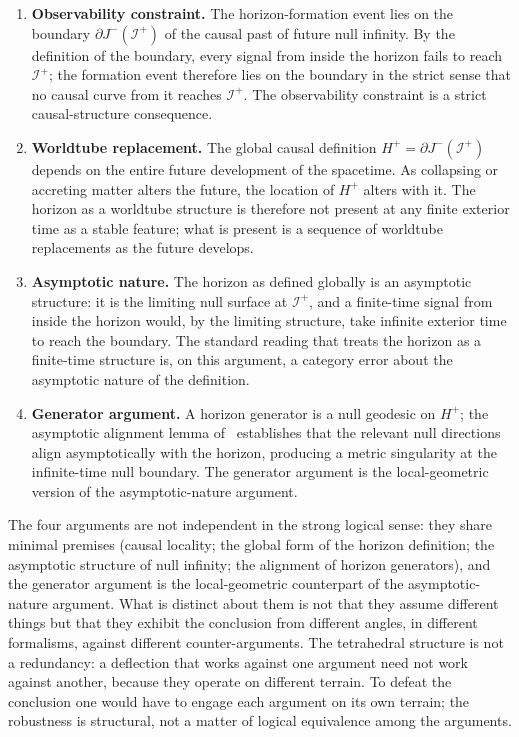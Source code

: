 \documentclass[11pt,a4paper]{article}
\theoremstyle{definition}
\begin{document}
\begin{enumerate}
\item \textbf{Observability constraint.} The horizon-formation event lies on the boundary $\partial J^{-}(\mathscr{I}^{+})$ of the causal past of future null infinity. By the definition of the boundary, every signal from inside the horizon fails to reach $\mathscr{I}^{+}$; the formation event therefore lies on the boundary in the strict sense that no causal curve from it reaches $\mathscr{I}^{+}$. The observability constraint is a strict causal-structure consequence.

\item \textbf{Worldtube replacement.} The global causal definition $H^{+}=\partial J^{-}(\mathscr{I}^{+})$ depends on the entire future development of the spacetime. As collapsing or accreting matter alters the future, the location of $H^{+}$ alters with it. The horizon as a worldtube structure is therefore not present at any finite exterior time as a stable feature; what is present is a sequence of worldtube replacements as the future develops.

\item \textbf{Asymptotic nature.} The horizon as defined globally is an asymptotic structure: it is the limiting null surface at $\mathscr{I}^{+}$, and a finite-time signal from inside the horizon would, by the limiting structure, take infinite exterior time to reach the boundary. The standard reading that treats the horizon as a finite-time structure is, on this argument, a category error about the asymptotic nature of the definition.

\item \textbf{Generator argument.} A horizon generator is a null geodesic on $H^{+}$; the asymptotic alignment lemma of~\cite{JanzenBHcausality} establishes that the relevant null directions align asymptotically with the horizon, producing a metric singularity at the infinite-time null boundary. The generator argument is the local-geometric version of the asymptotic-nature argument.
\end{enumerate}

The four arguments are not independent in the strong logical sense: they share minimal premises (causal locality; the global form of the horizon definition; the asymptotic structure of null infinity; the alignment of horizon generators), and the generator argument is the local-geometric counterpart of the asymptotic-nature argument. What is distinct about them is not that they assume different things but that they exhibit the conclusion from different angles, in different formalisms, against different counter-arguments. The tetrahedral structure is not a redundancy: a deflection that works against one argument need not work against another, because they operate on different terrain. To defeat the conclusion one would have to engage each argument on its own terrain; the robustness is structural, not a matter of logical equivalence among the arguments.
\end{document}
